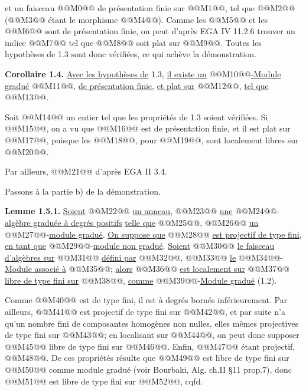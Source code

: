 
et un faisceau @@M0@@ de présentation finie sur @@M1@@, tel que @@M2@@ (@@M3@@ étant le morphisme @@M4@@). Comme les @@M5@@ et les @@M6@@ sont de présentation finie, on peut d'après EGA IV 11.2.6 trouver un indice @@M7@@ tel que @@M8@@ soit plat sur @@M9@@. Toutes les hypothèses de 1.3 sont donc vérifiées, ce qui achève la démonstration.

\textbf{Corollaire 1.4.} \uline{Avec les hypothèses de} 1.3, \uline{il existe un} @@M10@@\uline{-Module gradué} @@M11@@, \uline{de présentation finie}, \uline{et plat sur} @@M12@@, \uline{tel que} @@M13@@.

Soit @@M14@@ un entier tel que les propriétés de 1.3 soient vérifiées. Si @@M15@@, on a vu que @@M16@@ est de présentation finie, et il est plat sur @@M17@@, puisque les @@M18@@, pour @@M19@@, sont localement libres sur @@M20@@.

Par ailleurs, @@M21@@ d'après EGA II 3.4.

Passons à la partie b) de la démonstration.

\textbf{Lemme 1.5.1.} \uline{Soient} @@M22@@ \uline{un anneau}, @@M23@@ \uline{une} @@M24@@-\uline{algèbre graduée à degrés positifs} \uline{telle que} @@M25@@, @@M26@@ \uline{un} @@M27@@-\uline{module gradué}. \uline{On suppose que} @@M28@@ \uline{est projectif de type fini}, \uline{en tant que} @@M29@@-\uline{module non gradué}. \uline{Soient} @@M30@@ \uline{le faisceau d'algèbres sur} @@M31@@ \uline{défini par} @@M32@@, @@M33@@ \uline{le} @@M34@@-\uline{Module associé à} @@M35@@; \uline{alors} @@M36@@ \uline{est localement sur} @@M37@@ \uline{libre de type fini sur} @@M38@@, \uline{comme} @@M39@@-\uline{Module gradué} (1.2).

Comme @@M40@@ est de type fini, il est à degrés bornés inférieurement. Par ailleurs, @@M41@@ est projectif de type fini sur @@M42@@, et par suite n'a qu'un nombre fini de composantes homogènes non nulles, elles mêmes projectives de type fini sur @@M43@@; en localisant sur @@M44@@, on peut donc supposer @@M45@@ libre de type fini sur @@M46@@. Enfin, @@M47@@ étant projectif, @@M48@@. De ces propriétés résulte que @@M49@@ est libre de type fini sur @@M50@@ comme module gradué (voir Bourbaki, Alg. ch.II §11 prop.7), donc @@M51@@ est libre de type fini sur @@M52@@, cqfd.

